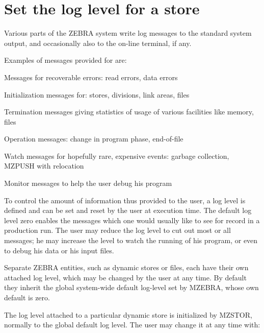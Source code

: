 \section{Set the log level for a store}
\par Various parts of the ZEBRA system write log messages
to the standard system output,
and occasionally also to the on-line terminal, if any.
\par Examples of messages provided for are:
\begin{UL}
\item Messages for recoverable errors: read errors, data errors
\item Initialization messages for: stores, divisions, link areas, files
\item Termination messages giving statistics of usage of
various facilities like memory, files
\item Operation messages: change in program phase, end-of-file
\item Watch messages for hopefully rare, expensive events:
garbage collection, MZPUSH with relocation
\item Monitor messages to help the user debug his program
\end{UL}
\par To control the amount of information thus provided to the user,
a log level is defined and can be set and reset by the user
at execution time.
The default log level zero enables the messages which one would
usually like to see for record in a production run.
The user may reduce the log level to cut out most or all messages;
he may increase the level to watch the running of his program,
or even to debug his data or his input files.
\par Separate ZEBRA entities, such as dynamic stores or files,
each have their own attached log level,
which may be changed by the user at any time.
By default they inherit the global system-wide default log-level
set by MZEBRA, whose own default is zero.
\par The log level attached to a particular dynamic store is initialized
by MZSTOR, normally to the global default log level.
The user may change it at any time with:
\par
